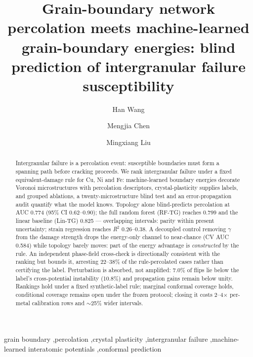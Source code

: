 \documentclass[preprint,12pt]{elsarticle}
\begin{document}
\begin{frontmatter}

\title{Grain-boundary network percolation meets machine-learned grain-boundary energies: blind prediction of intergranular failure susceptibility}

\author[zl]{Han Wang}
\author[zj,zl]{Mengjia Chen}
\author[zz]{Mingxiang Liu}


\begin{abstract}
Intergranular failure is a percolation event: susceptible boundaries must form a spanning path before cracking proceeds. We rank intergranular failure under a fixed equivalent-damage rule for Cu, Ni and Fe: machine-learned boundary energies decorate Voronoi microstructures with percolation descriptors, crystal-plasticity supplies labels, and grouped ablations, a twenty-microstructure blind test and an error-propagation audit quantify what the model knows. Topology alone blind-predicts percolation at AUC 0.774 (95\% CI 0.62--0.90); the full random forest (RF-TG) reaches 0.799 and the linear baseline (Lin-TG) 0.825 --- overlapping intervals: parity within present uncertainty; strain regression reaches \textit{R}$^{2}$ 0.26--0.38. A decoupled control removing $\gamma$ from the damage strength drops the energy-only channel to near-chance (CV AUC 0.584) while topology barely moves: part of the energy advantage is \textit{constructed} by the rule. An independent phase-field cross-check is directionally consistent with the ranking but bounds it, arresting 22--38\% of the rule-percolated cases rather than certifying the label. Perturbation is absorbed, not amplified: 7.0\% of flips lie below the label's cross-potential instability (10.8\%) and propagation gains remain below unity. Rankings hold under a fixed synthetic-label rule; marginal conformal coverage holds, conditional coverage remains open under the frozen protocol; closing it costs 2--4$\times$ per-metal calibration rows and $\sim$25\% wider intervals.
\end{abstract}

\begin{keyword}
grain boundary \sep percolation \sep crystal plasticity \sep intergranular failure \sep machine-learned interatomic potentials \sep conformal prediction
\end{keyword}

\end{frontmatter}
\end{document}
